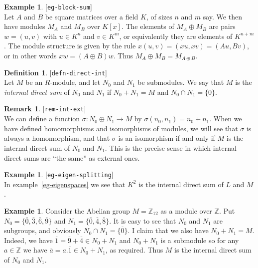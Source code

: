 \documentclass{amsart}
\newcommand{\lbl}[1]{\label{#1}\textup{[\texttt{#1}]}\ \\}
\newcommand{\lbl}{\label}
\newcommand{\Z}         {{\mathbb{Z}}}
\newcommand{\sg}        {\sigma}
\newcommand{\ov}[1]     {\overline{#1}}
\newcommand{\xra}       {\xrightarrow}
\newcommand{\op}        {\oplus}
\renewcommand{\:}{\colon}
\theoremstyle{definition}
\newtheorem{remark}[theorem]{Remark}
\newtheorem{definition}[theorem]{Definition}
\newtheorem{example}[theorem]{Example}
\begin{document}
\begin{example}\lbl{eg-block-sum}
 Let $A$ and $B$ be square matrices over a field $K$, of sizes $n$ and
 $m$ say.  We then have modules $M_A$ and $M_B$ over $K[x]$.  The
 elements of $M_A\op M_B$ are pairs $w=(u,v)$ with $u\in K^n$ and
 $v\in K^m$, or equivalently they are elements of $K^{n+m}$.  The
 module structure is given by the rule $x(u,v)=(xu,xv)=(Au,Bv)$, or in
 other words $xw=(A\op B)w$.  Thus $M_A\op M_B=M_{A\op B}$.
\end{example}

\begin{definition}\lbl{defn-direct-int}
 Let $M$ be an $R$-module, and let $N_0$ and $N_1$ be submodules.  We
 say that $M$ is the \emph{internal direct sum} of $N_0$ and $N_1$ if
 $N_0+N_1=M$ and $N_0\cap N_1=\{0\}$. 
\end{definition}
\begin{remark}\lbl{rem-int-ext}
 We can define a function $\sg\:N_0\op N_1\xra{}M$ by
 $\sg(n_0,n_1)=n_0+n_1$.  When we have defined homomorphisms and
 isomorphisms of modules, we will see that $\sg$ is always a
 homomorphism, and that $\sg$ is an isomorphism if and only if $M$ is
 the internal direct sum of $N_0$ and $N_1$.  This is the precise
 sense in which internal direct sums are ``the same'' as external
 ones.
\end{remark}
\begin{example}\lbl{eg-eigen-splitting}
 In example~\ref{eg-eigenspaces} we see that $K^2$ is the internal
 direct sum of $L$ and $M$.
\end{example}
\begin{example}
 Consider the Abelian group $M=\Z_{12}$ as a module over $\Z$.  Put
 $N_0=\{\ov{0},\ov{3},\ov{6},\ov{9}\}$ and
 $N_1=\{\ov{0},\ov{4},\ov{8}\}$.  It is easy to see that $N_0$ and
 $N_1$ are subgroups, and obviously $N_0\cap N_1=\{\ov{0}\}$.  I claim
 that we also have $N_0+N_1=M$.  Indeed, we have
 $\ov{1}=\ov{9}+\ov{4}\in N_0+N_1$ and $N_0+N_1$ is a submodule so for
 any $a\in\Z$ we have $\ov{a}=a.\ov{1}\in N_0+N_1$, as required.  Thus
 $M$ is the internal direct sum of $N_0$ and $N_1$.
\end{example}
\end{document}
